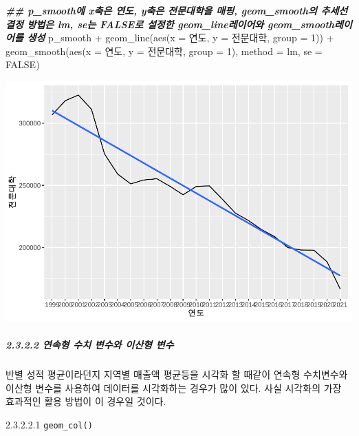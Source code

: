 \documentclass[
]{article}
\newenvironment{Shaded}{\begin{snugshade}}{\end{snugshade}}
\newcommand{\AttributeTok}[1]{\textcolor[rgb]{0.77,0.63,0.00}{#1}}
\newcommand{\ConstantTok}[1]{\textcolor[rgb]{0.00,0.00,0.00}{#1}}
\newcommand{\DecValTok}[1]{\textcolor[rgb]{0.00,0.00,0.81}{#1}}
\newcommand{\DocumentationTok}[1]{\textcolor[rgb]{0.56,0.35,0.01}{\textbf{\textit{#1}}}}
\newcommand{\FunctionTok}[1]{\textcolor[rgb]{0.00,0.00,0.00}{#1}}
\newcommand{\NormalTok}[1]{#1}
\newcommand{\SpecialCharTok}[1]{\textcolor[rgb]{0.00,0.00,0.00}{#1}}
\newcommand{\StringTok}[1]{\textcolor[rgb]{0.31,0.60,0.02}{#1}}
\begin{document}
\begin{Shaded}
\begin{Highlighting}[]
\DocumentationTok{\#\#  p\_smooth에 x축은 연도, y축은 전문대학을 매핑, geom\_smooth의 추세선 결정 방법은 \textquotesingle{}lm\textquotesingle{}, se는 FALSE로 설정한 geom\_line레이어와 geom\_smooth레이어를 생성}
\NormalTok{p\_smooth }\SpecialCharTok{+}
  \FunctionTok{geom\_line}\NormalTok{(}\FunctionTok{aes}\NormalTok{(}\AttributeTok{x =}\NormalTok{ 연도, }\AttributeTok{y =}\NormalTok{ 전문대학, }\AttributeTok{group =} \DecValTok{1}\NormalTok{)) }\SpecialCharTok{+}
  \FunctionTok{geom\_smooth}\NormalTok{(}\FunctionTok{aes}\NormalTok{(}\AttributeTok{x =}\NormalTok{ 연도, }\AttributeTok{y =}\NormalTok{ 전문대학, }\AttributeTok{group =} \DecValTok{1}\NormalTok{), }\AttributeTok{method =} \StringTok{\textquotesingle{}lm\textquotesingle{}}\NormalTok{, }\AttributeTok{se =} \ConstantTok{FALSE}\NormalTok{)}
\end{Highlighting}
\end{Shaded}

\includegraphics{chap3_files/figure-latex/unnamed-chunk-34-2.pdf}

\hypertarget{uxc5f0uxc18duxd615-uxc218uxce58-uxbcc0uxc218uxc640-uxc774uxc0b0uxd615-uxbcc0uxc218}{%
\subparagraph{2.3.2.2 연속형 수치 변수와 이산형 변수}\label{uxc5f0uxc18duxd615-uxc218uxce58-uxbcc0uxc218uxc640-uxc774uxc0b0uxd615-uxbcc0uxc218}}

반별 성적 평균이라던지 지역별 매출액 평균등을 시각화 할 때같이 연속형 수치변수와 이산형 변수를 사용하여 데이터를 시각화하는 경우가 많이 있다. 사실 시각화의 가장 효과적인 활용 방법이 이 경우일 것이다.

2.3.2.2.1 \texttt{geom\_col()}
\end{document}
